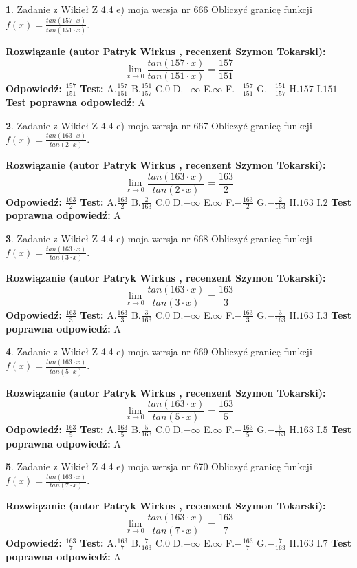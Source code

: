 \documentclass[12pt, a4paper]{article}
\theoremstyle{definition} %
\newtheorem{zad}{}
\newcommand{\zadStart}[1]{\begin{zad}#1\newline}
\newcommand{\zadStop}{\end{zad}}
\newcommand{\rozwStart}[2]{\noindent \textbf{Rozwiązanie (autor #1 , recenzent #2): }\newline}
\newcommand{\rozwStop}{\newline}
\newcommand{\odpStart}{\noindent \textbf{Odpowiedź:}\newline}
\newcommand{\odpStop}{\newline}
\newcommand{\testStart}{\noindent \textbf{Test:}\newline}
\newcommand{\testStop}{\newline}
\newcommand{\kluczStart}{\noindent \textbf{Test poprawna odpowiedź:}\newline}
\newcommand{\kluczStop}{\newline}
\begin{document}
\zadStart{Zadanie z Wikieł Z 4.4 e) moja wersja nr 666}
Obliczyć granicę funkcji $f(x)=\frac{tan(157\cdot x)}{tan(151\cdot x)}$.
\zadStop
\rozwStart{Patryk Wirkus}{Szymon Tokarski}
$$\lim\limits_{x\to 0}\frac{tan(157\cdot x)}{tan(151\cdot x)}=
\frac{157}{151}$$
\rozwStop
\odpStart
$\frac{157}{151}$
\odpStop
\testStart
A.$\frac{157}{151}$
B.$\frac{151}{157}$
C.$0$
D.$-\infty$
E.$\infty$
F.$-\frac{157}{151}$
G.$-\frac{151}{157}$
H.$157$
I.$151$
\testStop
\kluczStart
A
\kluczStop



\zadStart{Zadanie z Wikieł Z 4.4 e) moja wersja nr 667}
Obliczyć granicę funkcji $f(x)=\frac{tan(163\cdot x)}{tan(2\cdot x)}$.
\zadStop
\rozwStart{Patryk Wirkus}{Szymon Tokarski}
$$\lim\limits_{x\to 0}\frac{tan(163\cdot x)}{tan(2\cdot x)}=
\frac{163}{2}$$
\rozwStop
\odpStart
$\frac{163}{2}$
\odpStop
\testStart
A.$\frac{163}{2}$
B.$\frac{2}{163}$
C.$0$
D.$-\infty$
E.$\infty$
F.$-\frac{163}{2}$
G.$-\frac{2}{163}$
H.$163$
I.$2$
\testStop
\kluczStart
A
\kluczStop



\zadStart{Zadanie z Wikieł Z 4.4 e) moja wersja nr 668}
Obliczyć granicę funkcji $f(x)=\frac{tan(163\cdot x)}{tan(3\cdot x)}$.
\zadStop
\rozwStart{Patryk Wirkus}{Szymon Tokarski}
$$\lim\limits_{x\to 0}\frac{tan(163\cdot x)}{tan(3\cdot x)}=
\frac{163}{3}$$
\rozwStop
\odpStart
$\frac{163}{3}$
\odpStop
\testStart
A.$\frac{163}{3}$
B.$\frac{3}{163}$
C.$0$
D.$-\infty$
E.$\infty$
F.$-\frac{163}{3}$
G.$-\frac{3}{163}$
H.$163$
I.$3$
\testStop
\kluczStart
A
\kluczStop



\zadStart{Zadanie z Wikieł Z 4.4 e) moja wersja nr 669}
Obliczyć granicę funkcji $f(x)=\frac{tan(163\cdot x)}{tan(5\cdot x)}$.
\zadStop
\rozwStart{Patryk Wirkus}{Szymon Tokarski}
$$\lim\limits_{x\to 0}\frac{tan(163\cdot x)}{tan(5\cdot x)}=
\frac{163}{5}$$
\rozwStop
\odpStart
$\frac{163}{5}$
\odpStop
\testStart
A.$\frac{163}{5}$
B.$\frac{5}{163}$
C.$0$
D.$-\infty$
E.$\infty$
F.$-\frac{163}{5}$
G.$-\frac{5}{163}$
H.$163$
I.$5$
\testStop
\kluczStart
A
\kluczStop



\zadStart{Zadanie z Wikieł Z 4.4 e) moja wersja nr 670}
Obliczyć granicę funkcji $f(x)=\frac{tan(163\cdot x)}{tan(7\cdot x)}$.
\zadStop
\rozwStart{Patryk Wirkus}{Szymon Tokarski}
$$\lim\limits_{x\to 0}\frac{tan(163\cdot x)}{tan(7\cdot x)}=
\frac{163}{7}$$
\rozwStop
\odpStart
$\frac{163}{7}$
\odpStop
\testStart
A.$\frac{163}{7}$
B.$\frac{7}{163}$
C.$0$
D.$-\infty$
E.$\infty$
F.$-\frac{163}{7}$
G.$-\frac{7}{163}$
H.$163$
I.$7$
\testStop
\kluczStart
A
\kluczStop
\end{document}
